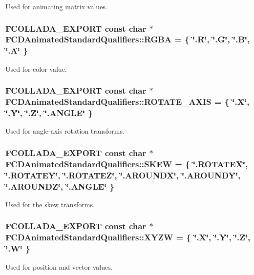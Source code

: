 \label{namespaceFCDAnimatedStandardQualifiers_a326b2afcd7eb67b2cb9b9b7c255ecd7f}
Used for animating matrix values. \hypertarget{namespaceFCDAnimatedStandardQualifiers_ab52f470388beb5e2e143950fa66650d1}{
\subsubsection[{RGBA}]{\setlength{\rightskip}{0pt plus 5cm}FCOLLADA\_\-EXPORT const char $\ast$ {\bf FCDAnimatedStandardQualifiers::RGBA} = \{ \char`\"{}.R\char`\"{}, \char`\"{}.G\char`\"{}, \char`\"{}.B\char`\"{}, \char`\"{}.A\char`\"{} \}}}
\label{namespaceFCDAnimatedStandardQualifiers_ab52f470388beb5e2e143950fa66650d1}
Used for color value. \hypertarget{namespaceFCDAnimatedStandardQualifiers_a3daffe3d91ba79acbfdcd2571d09a819}{
\subsubsection[{ROTATE\_\-AXIS}]{\setlength{\rightskip}{0pt plus 5cm}FCOLLADA\_\-EXPORT const char $\ast$ {\bf FCDAnimatedStandardQualifiers::ROTATE\_\-AXIS} = \{ \char`\"{}.X\char`\"{}, \char`\"{}.Y\char`\"{}, \char`\"{}.Z\char`\"{}, \char`\"{}.ANGLE\char`\"{} \}}}
\label{namespaceFCDAnimatedStandardQualifiers_a3daffe3d91ba79acbfdcd2571d09a819}
Used for angle-\/axis rotation transforms. \hypertarget{namespaceFCDAnimatedStandardQualifiers_a8022c3d11024cfe71bb0d07f3e7dbc55}{
\subsubsection[{SKEW}]{\setlength{\rightskip}{0pt plus 5cm}FCOLLADA\_\-EXPORT const char $\ast$ {\bf FCDAnimatedStandardQualifiers::SKEW} = \{ \char`\"{}.ROTATEX\char`\"{}, \char`\"{}.ROTATEY\char`\"{}, \char`\"{}.ROTATEZ\char`\"{}, \char`\"{}.AROUNDX\char`\"{}, \char`\"{}.AROUNDY\char`\"{}, \char`\"{}.AROUNDZ\char`\"{}, \char`\"{}.ANGLE\char`\"{} \}}}
\label{namespaceFCDAnimatedStandardQualifiers_a8022c3d11024cfe71bb0d07f3e7dbc55}
Used for the skew transforms. \hypertarget{namespaceFCDAnimatedStandardQualifiers_a05e7e8fa7a544c64eb06eb390e856145}{
\subsubsection[{XYZW}]{\setlength{\rightskip}{0pt plus 5cm}FCOLLADA\_\-EXPORT const char $\ast$ {\bf FCDAnimatedStandardQualifiers::XYZW} = \{ \char`\"{}.X\char`\"{}, \char`\"{}.Y\char`\"{}, \char`\"{}.Z\char`\"{}, \char`\"{}.W\char`\"{} \}}}
\label{namespaceFCDAnimatedStandardQualifiers_a05e7e8fa7a544c64eb06eb390e856145}
Used for position and vector values. 